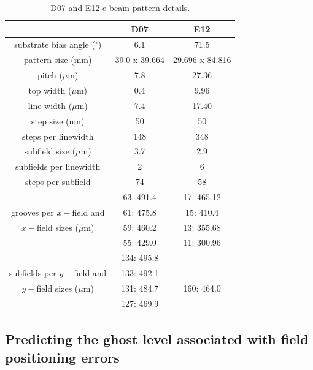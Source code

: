 \documentclass[]{spie}  %
\begin{document}
\begin{table}
	\begin{center}
	\caption{D07 and E12 e-beam pattern details. \label{tab:D07andE12}}
	\begin{tabular}{ccc}
	\toprule
	   &D07 & E12  \\
	\midrule
	substrate bias angle ($^\circ$) & 6.1 & 71.5 \\
	pattern size (mm) & 39.0 x 39.664 & 29.696 x 84.816 \\
	pitch ($\mu$m) & 7.8 & 27.36 \\
	top width ($\mu$m) & 0.4 & 9.96 \\
	line width ($\mu$m) & 7.4 & 17.40 \\
	step size (nm) & 50 & 50 \\
	steps per linewidth & 148 & 348 \\
	subfield size ($\mu$m) & 3.7 & 2.9 \\
	subfields per linewidth & 2 & 6 \\
	steps per subfield & 74 & 58 \\
	\cline{1-1}
	 			      & 63: 491.4  & 17: 465.12 \\
	grooves per $x-$field and & 61: 475.8 & 15: 410.4 \\
	$x-$field sizes ($\mu$m) & 59: 460.2 & 13: 355.68 \\
	 				        & 55: 429.0 & 11: 300.96 \\
	\cline{1-1}					        
	 			      & 134: 495.8  &   \\
	subfields per $y-$field and & 133: 492.1 &   \\
	$y-$field sizes ($\mu$m) & 131: 484.7 & 160: 464.0 \\
	 				        & 127: 469.9 &   \\	
	\cline{1-1}
	\bottomrule
	\end{tabular}
	\end{center}
\end{table}	



\subsection{Predicting the ghost level associated with field positioning errors}
\label{sec:Ghosts}
\end{document}
